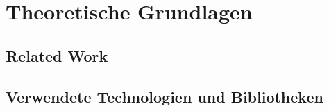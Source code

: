 \chapter{Theoretische Grundlagen}

\section{Related Work}

\section{Verwendete Technologien und Bibliotheken}

